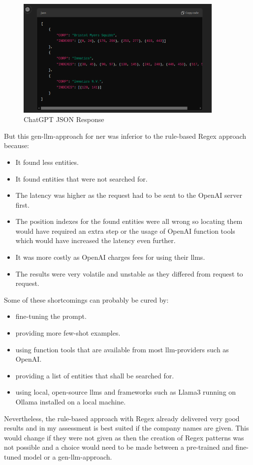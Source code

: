 \begin{figure}[H]
    \centering                                                  
    \includegraphics[width=0.9\textwidth]{Assets/chatgpt2}
    \caption{ChatGPT JSON Response}
    \label{fig:chatgpt2}
\end{figure}

But this \gls{gen-llm}-approach for \gls{ner} was inferior to the rule-based \gls{Regex} approach because:

\begin{itemize}
\item It found less entities.
\item It found entities that were not searched for.
\item The latency was higher as the request had to be sent to the OpenAI server first.
\item The position indexes for the found entities were all wrong so locating them would have required an extra step or the usage of OpenAI function tools which would have increased the latency even further.
\item It was more costly as OpenAI charges fees for using their \glspl{llm}.
\item The results were very volatile and unstable as they differed from request to request.
\end{itemize}

Some of these shortcomings can probably be cured by:
\begin{itemize}
\item fine-tuning the \gls{prompt}.
\item providing more few-shot examples.
\item using function tools that are available from most \gls{llm}-providers such as OpenAI.
\item providing a list of entities that shall be searched for.
\item using local, open-source \glspl{llm} and frameworks such as Llama3 \cite{llama3} running on Ollama \cite{ollama} installed on a local machine.
\end{itemize}
Nevertheless, the rule-based approach with \gls{Regex} already delivered very good results and in my assessment is best suited if the company names are given.
This would change if they were not given as then the creation of \gls{Regex} patterns was not possible and a choice would need to be made between a pre-trained and fine-tuned model or a \gls{gen-llm}-approach.

